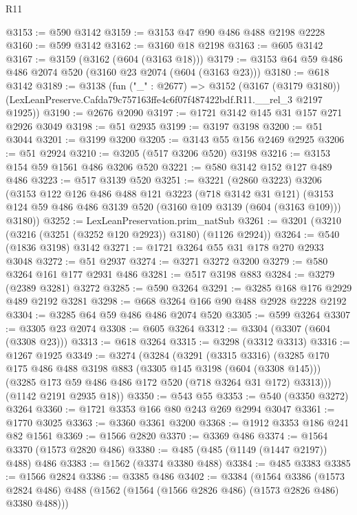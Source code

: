 \begin{lexlean}{R11}
\begin{coremodule}
@3153 := @590 @3142
@3159 := @3153 @47 @90 @486 @488 @2198 @2228
@3160 := @599 @3142
@3162 := @3160 @18 @2198
@3163 := @605 @3142
@3167 := @3159 (@3162 (@604 (@3163 @18)))
@3179 := @3153 @64 @59 @486 @486 @2074 @520 (@3160 @23 @2074 (@604 (@3163 @23)))
@3180 := @618 @3142
@3189 := @3138
    (fun ("_" : @2677) =>
    @3152
      (@3167 (@3179 @3180))
      (LexLeanPreserve.Cafda79c757163ffe4c6f07f487422bdf.R11.__rel_3 @2197 @1925))
@3190 := @2676 @2090
@3197 := @1721 @3142 @145 @31 @157 @271 @2926 @3049
@3198 := @51 @2935
@3199 := @3197 @3198
@3200 := @51 @3044
@3201 := @3199 @3200
@3205 := @3143 @55 @156 @2469 @2925
@3206 := @51 @2924
@3210 := @3205 (@517 @3206 @520) @3198
@3216 := @3153 @154 @59 @1561 @486 @3206 @520
@3221 := @580 @3142 @152 @127 @489 @486
@3223 := @517 @3139 @520
@3251 := @3221
    (@2860 @3223)
    @3206
    (@3153
      @122
      @126
      @486
      @488
      @121
      @3223
      (@718 @3142 @31 @121)
      (@3153 @124 @59 @486 @486 @3139 @520 (@3160 @109 @3139 (@604 (@3163 @109))) @3180))
@3252 := LexLeanPreservation.prim_natSub
@3261 := @3201 (@3210 (@3216 (@3251 (@3252 @120 @2923)) @3180) (@1126 @2924))
@3264 := @540 (@1836 @3198) @3142
@3271 := @1721 @3264 @55 @31 @178 @270 @2933 @3048
@3272 := @51 @2937
@3274 := @3271 @3272 @3200
@3279 := @580 @3264 @161 @177 @2931 @486
@3281 := @517 @3198 @883
@3284 := @3279 (@2389 @3281) @3272
@3285 := @590 @3264
@3291 := @3285 @168 @176 @2929 @489 @2192 @3281
@3298 := @668 @3264 @166 @90 @488 @2928 @2228 @2192
@3304 := @3285 @64 @59 @486 @486 @2074 @520
@3305 := @599 @3264
@3307 := @3305 @23 @2074
@3308 := @605 @3264
@3312 := @3304 (@3307 (@604 (@3308 @23)))
@3313 := @618 @3264
@3315 := @3298 (@3312 @3313)
@3316 := @1267 @1925
@3349 := @3274
    (@3284
      (@3291
        (@3315 @3316)
        (@3285
          @170
          @175
          @486
          @488
          @3198
          @883
          (@3305 @145 @3198 (@604 (@3308 @145)))
          (@3285 @173 @59 @486 @486 @172 @520 (@718 @3264 @31 @172) @3313)))
      (@1142 @2191 @2935 @18))
@3350 := @543 @55
@3353 := @540 (@3350 @3272) @3264
@3360 := @1721 @3353 @166 @80 @243 @269 @2994 @3047
@3361 := @1770 @3025
@3363 := @3360 @3361 @3200
@3368 := @1912 @3353 @186 @241 @82 @1561
@3369 := @1566 @2820
@3370 := @3369 @486
@3374 := @1564 @3370 (@1573 @2820 @486)
@3380 := @485 (@485 (@1149 (@1447 @2197)) @488) @486
@3383 := @1562 (@3374 @3380 @488)
@3384 := @485 @3383
@3385 := @1566 @2824
@3386 := @3385 @486
@3402 := @3384
    (@1564
      @3386
      (@1573 @2824 @486)
      @488
      (@1562 (@1564 (@1566 @2826 @486) (@1573 @2826 @486) @3380 @488)))

\end{coremodule}
\end{lexlean}
